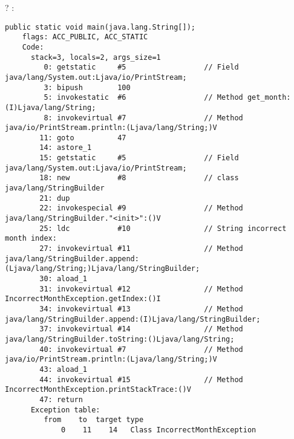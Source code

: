 
?
 \main \InENRU {}:

\begin{lstlisting}[caption=Month2.class]
  public static void main(java.lang.String[]);
    flags: ACC_PUBLIC, ACC_STATIC
    Code:
      stack=3, locals=2, args_size=1
         0: getstatic     #5                  // Field java/lang/System.out:Ljava/io/PrintStream;
         3: bipush        100
         5: invokestatic  #6                  // Method get_month:(I)Ljava/lang/String;
         8: invokevirtual #7                  // Method java/io/PrintStream.println:(Ljava/lang/String;)V
        11: goto          47
        14: astore_1      
        15: getstatic     #5                  // Field java/lang/System.out:Ljava/io/PrintStream;
        18: new           #8                  // class java/lang/StringBuilder
        21: dup           
        22: invokespecial #9                  // Method java/lang/StringBuilder."<init>":()V
        25: ldc           #10                 // String incorrect month index: 
        27: invokevirtual #11                 // Method java/lang/StringBuilder.append:(Ljava/lang/String;)Ljava/lang/StringBuilder;
        30: aload_1       
        31: invokevirtual #12                 // Method IncorrectMonthException.getIndex:()I
        34: invokevirtual #13                 // Method java/lang/StringBuilder.append:(I)Ljava/lang/StringBuilder;
        37: invokevirtual #14                 // Method java/lang/StringBuilder.toString:()Ljava/lang/String;
        40: invokevirtual #7                  // Method java/io/PrintStream.println:(Ljava/lang/String;)V
        43: aload_1       
        44: invokevirtual #15                 // Method IncorrectMonthException.printStackTrace:()V
        47: return        
      Exception table:
         from    to  target type
             0    11    14   Class IncorrectMonthException
\end{lstlisting}

